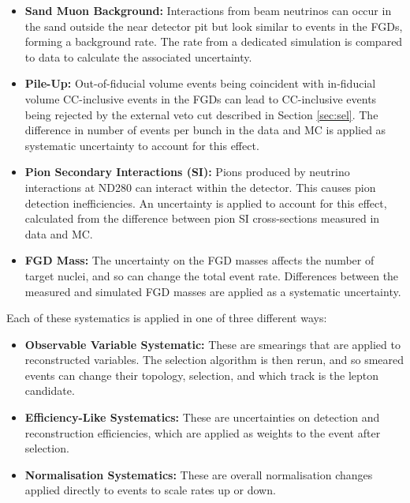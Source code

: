 \begin{itemize}
\item \textbf{Sand Muon Background:} Interactions from beam neutrinos can occur in the sand outside the near detector pit but look similar to events in the FGDs, forming a background rate. The rate from a dedicated simulation is compared to data to calculate the associated uncertainty.

\item \textbf{Pile-Up:} Out-of-fiducial volume events being coincident with in-fiducial volume CC-inclusive events in the FGDs can lead to CC-inclusive events being rejected by the external veto cut described in Section \ref{sec:sel}. The difference in number of events per bunch in the data and MC is applied as systematic uncertainty to account for this effect.

\item \textbf{Pion Secondary Interactions (SI):} Pions produced by neutrino interactions at ND280 can interact within the detector. This causes pion detection inefficiencies. An uncertainty is applied to account for this effect, calculated from the difference between pion SI cross-sections measured in data and MC.

\item \textbf{FGD Mass:} The uncertainty on the FGD masses affects the number of target nuclei, and so can change the total event rate. Differences between the measured and simulated FGD masses are applied as a systematic uncertainty.

\end{itemize}

Each of these systematics is applied in one of three different ways:

\begin{itemize}

\item \textbf{Observable Variable Systematic:} These are smearings that are applied to reconstructed variables. The selection algorithm is then rerun, and so smeared events can change their topology, selection, and which track is the lepton candidate.

\item \textbf{Efficiency-Like Systematics:} These are uncertainties on detection and reconstruction efficiencies, which are applied as weights to the event after selection.

\item \textbf{Normalisation Systematics:} These are overall normalisation changes applied directly to events to scale rates up or down.

\end{itemize}

